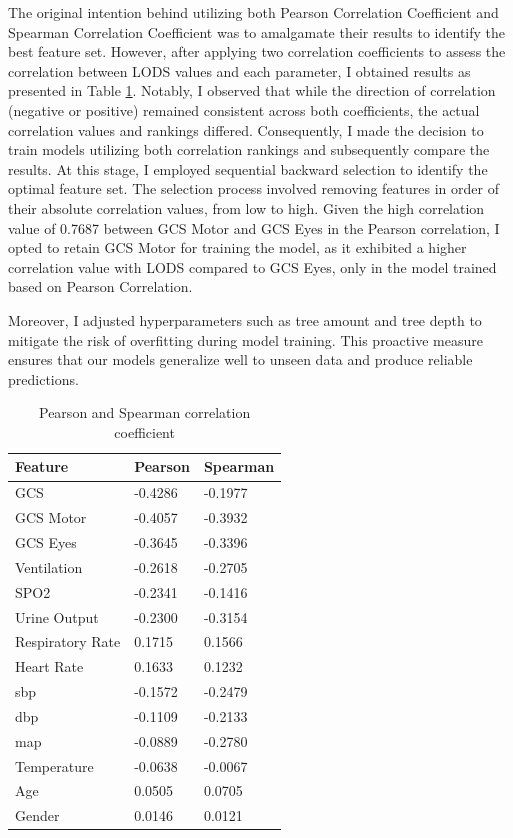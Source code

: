 \documentclass[12pt,a4paper,english
]{tunithesis}
\begin{document}
The original intention behind utilizing both Pearson Correlation Coefficient and Spearman Correlation Coefficient was to amalgamate their results to identify the best feature set. However, after applying two correlation coefficients to assess the correlation between LODS values and each parameter, I obtained results as presented in Table \ref{table:cc_value}. Notably, I observed that while the direction of correlation (negative or positive) remained consistent across both coefficients, the actual correlation values and rankings differed. Consequently, I made the decision to train models utilizing both correlation rankings and subsequently compare the results. At this stage, I employed sequential backward selection to identify the optimal feature set. The selection process involved removing features in order of their absolute correlation values, from low to high. Given the high correlation value of 0.7687 between GCS Motor and GCS Eyes in the Pearson correlation, I opted to retain GCS Motor for training the model, as it exhibited a higher correlation value with LODS compared to GCS Eyes, only in the model trained based on Pearson Correlation.

Moreover, I adjusted hyperparameters such as tree amount and tree depth to mitigate the risk of overfitting during model training. This proactive measure ensures that our models generalize well to unseen data and produce reliable predictions.

\begin{table}[ht]
\centering
    \caption{Pearson and Spearman correlation coefficient}
    \label{table:cc_value}
    \begin{tabular}{|l|l|l|}
        \hline
        \textbf{Feature} & \textbf{Pearson} & \textbf{Spearman} \\ \hline
            GCS & -0.4286 & -0.1977 \\ \hline
            GCS Motor & -0.4057 & -0.3932 \\ \hline
            GCS Eyes & -0.3645 & -0.3396 \\ \hline
            Ventilation & -0.2618 & -0.2705 \\ \hline
            SPO2 & -0.2341 & -0.1416 \\ \hline
            Urine Output & -0.2300 & -0.3154 \\ \hline
            Respiratory Rate & 0.1715 & 0.1566\\ \hline
            Heart Rate & 0.1633 & 0.1232 \\ \hline
            sbp & -0.1572 & -0.2479 \\ \hline
            dbp & -0.1109 & -0.2133 \\ \hline
            map & -0.0889 & -0.2780 \\ \hline
            Temperature & -0.0638 & -0.0067 \\ \hline
            Age & 0.0505 & 0.0705 \\ \hline
            Gender & 0.0146 & 0.0121 \\ \hline
    \end{tabular}
\end{table}
\end{document}
